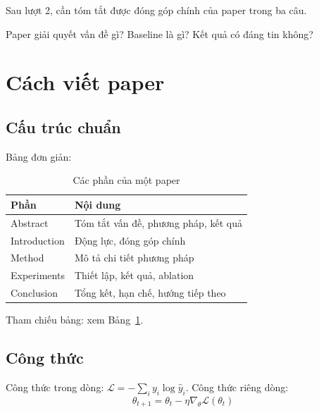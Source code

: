 \documentclass[11pt,a4paper]{article}
\begin{document}
\begin{keyidea}
Sau lượt 2, cần tóm tắt được đóng góp chính của paper trong ba câu.
\end{keyidea}

\begin{question}
Paper giải quyết vấn đề gì? Baseline là gì? Kết quả có đáng tin không?
\end{question}

\section{Cách viết paper}

\subsection{Cấu trúc chuẩn}

Bảng đơn giản:

\begin{table}[H]
  \centering
  \caption{Các phần của một paper}
  \label{tab:structure}
  \begin{tabularx}{\linewidth}{l X}
    \toprule
    \textbf{Phần} & \textbf{Nội dung} \\
    \midrule
    Abstract     & Tóm tắt vấn đề, phương pháp, kết quả \\
    Introduction & Động lực, đóng góp chính \\
    Method       & Mô tả chi tiết phương pháp \\
    Experiments  & Thiết lập, kết quả, ablation \\
    Conclusion   & Tổng kết, hạn chế, hướng tiếp theo \\
    \bottomrule
  \end{tabularx}
\end{table}

Tham chiếu bảng: xem Bảng~\ref{tab:structure}.

\subsection{Công thức}

Công thức trong dòng: $\mathcal{L} = -\sum_i y_i \log \hat{y}_i$. Công thức riêng dòng:
\begin{equation}
  \theta_{t+1} = \theta_t - \eta \nabla_\theta \mathcal{L}(\theta_t)
  \label{eq:sgd}
\end{equation}
\end{document}
